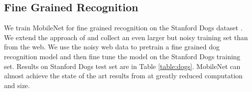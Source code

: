 \documentclass[10pt,twocolumn,letterpaper]{article}
\begin{document}
\begin{table}[t]
  \caption{Smaller MobileNet Comparison to Popular Models} %
\centering %
\end{table}

\subsection{Fine Grained Recognition}
We train MobileNet for fine grained recognition on the Stanford Dogs dataset \cite{KhoslaYaoJayadevaprakashFeiFei_FGVC2011}.
We extend the approach of \cite{krause2015unreasonable} and collect an even larger but noisy training set than \cite{krause2015unreasonable} from the web.
We use the noisy web data to pretrain a fine grained dog recognition model and then fine tune the model on the Stanford Dogs training set.
Results on Stanford Dogs test set are in Table \ref{table:dogs}. MobileNet can almost achieve the state of the art results from
\cite{krause2015unreasonable} at greatly reduced computation and size.


\begin{table}[t]
  \caption{MobileNet for Stanford Dogs} %
\centering %
\end{table}
\end{document}
